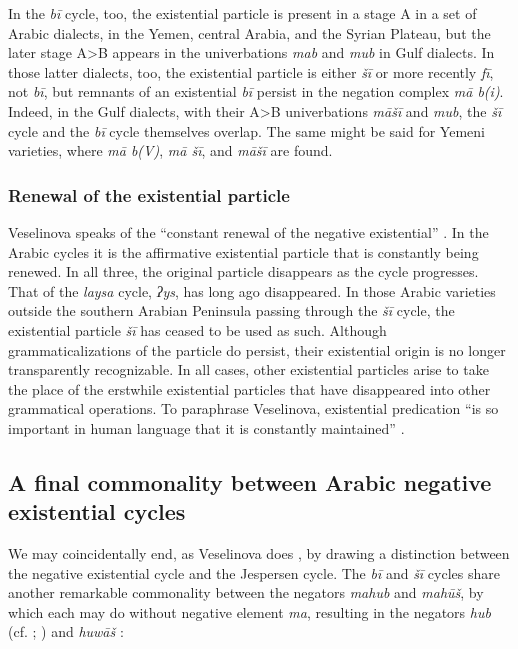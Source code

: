 \documentclass[output=paper,colorlinks,citecolor=brown]{langscibook}
\begin{document}
In the \textit{bī} cycle, too, the existential particle is present in a stage A in a set of Arabic dialects, in the Yemen, central Arabia, and the Syrian Plateau, but the later stage A>B appears in the univerbations \textit{mab} and \textit{mub} in Gulf dialects. In those latter dialects, too, the existential particle is either \textit{šī} or more recently \textit{fī}, not \textit{bī}, but remnants of an existential \textit{bī} persist in the negation complex \textit{mā b(i)}. Indeed, in the Gulf dialects, with their A>B univerbations \textit{māšī} and \textit{mub}, the \textit{šī} cycle and the \textit{bī} cycle themselves overlap. The same might be said for Yemeni varieties, where \textit{mā b(V)}, \textit{mā šī}, and \textit{māšī} are found. 

\subsubsection{Renewal of the existential particle} \label{s:WiAR-5.1.2}
\largerpage
Veselinova speaks of the “constant renewal of the negative existential” \citeyearpar[173]{Veselinova2016}. In the Arabic cycles it is the affirmative existential particle that is constantly being renewed. In all three, the original particle disappears as the cycle progresses. That of the \textit{laysa} cycle, \textit{ʔys}, has long ago disappeared. In those Arabic varieties outside the southern Arabian Peninsula passing through the \textit{šī} cycle, the existential particle \textit{šī} has ceased to be used as such. Although grammaticalizations of the particle do persist, their existential origin is no longer transparently recognizable. In all cases, other existential particles arise to take the place of the erstwhile existential particles that have disappeared into other grammatical operations. To paraphrase Veselinova, existential predication “is so important in human language that it is constantly maintained” \citep[173]{Veselinova2016}.

\subsection{A final commonality between Arabic negative existential cycles} \label{s:WiAR-5.1.3}

We may coincidentally end, as Veselinova does \citeyearpar[174]{Veselinova2016}, by drawing a distinction between the negative existential cycle and the Jespersen cycle. The \textit{bī} and \textit{šī} cycles share another remarkable commonality between the negators \textit{mahub} and \textit{mahūš}, by which each may do without negative element \textit{ma}, resulting in the negators \textit{hub} (cf. \citealp[64, 73, 116]{holes1990a}; \citeyear[106]{holes2016a}) and \textit{huwāš} \citep[22]{reinhardt1894a}:
\end{document}
